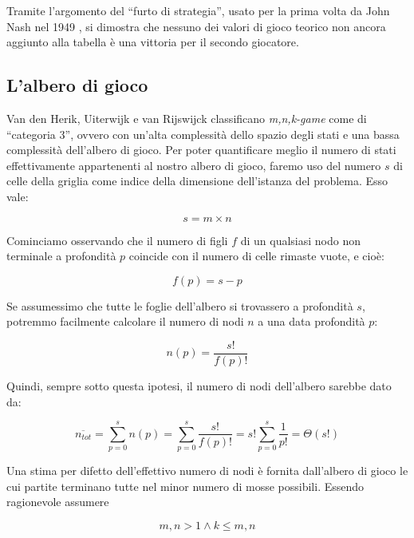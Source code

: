 \documentclass{article}
\begin{document}
Tramite l'argomento del ``furto di strategia'', usato per la prima volta da John
Nash nel 1949 \cite{at.UBO716493520180101}, si dimostra che nessuno dei valori
di gioco teorico non ancora aggiunto alla tabella è una vittoria per il secondo
giocatore.

\subsection{L'albero di gioco}

Van den Herik, Uiterwijk e van Rijswijck \cite{VANDENHERIK2002277} classificano
\emph{m,n,k-game} come di ``categoria 3'', ovvero con un'alta complessità dello
spazio degli stati e una bassa complessità dell'albero di gioco. Per poter
quantificare meglio il numero di stati effettivamente appartenenti al nostro
albero di gioco, faremo uso del numero $s$ di celle della griglia come indice
della dimensione dell'istanza del problema. Esso vale:

\begin{equation}
s = m \times n
\end{equation}

Cominciamo osservando che il numero di figli $f$ di un qualsiasi nodo non
terminale a profondità $p$ coincide con il numero di celle rimaste vuote, e
cioè:

\begin{equation}
  f(p) = s - p
\end{equation}

Se assumessimo che tutte le foglie dell'albero si trovassero a profondità $s$,
potremmo facilmente calcolare il numero di nodi $n$ a una data profondità $p$:

\begin{equation}
  n(p) = \frac{s!}{f(p)!}
\end{equation}

Quindi, sempre sotto questa ipotesi, il numero di nodi dell'albero sarebbe dato
da:

\begin{equation}
 \overline{n_{tot}} = \sum_{p = 0}^{s} n(p) = \sum_{p = 0}^{s} \frac{s!}{f(p)!}
  = s! \sum_{p = 0}^{s} \frac{1}{p!} = \varTheta(s!)
\end{equation}

Una stima per difetto dell'effettivo numero di nodi è fornita dall'albero di
gioco le cui partite terminano tutte nel minor numero di mosse possibili.
Essendo ragionevole assumere

\begin{equation}
  m, n > 1 \wedge k \leq m, n
\end{equation}
\end{document}

